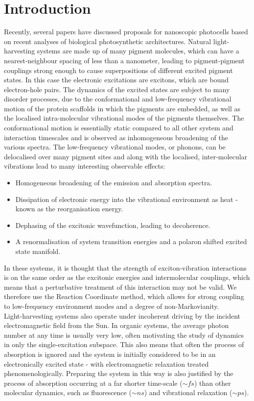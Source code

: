 \documentclass[]{article}
\begin{document}
\section{Introduction}

Recently, several papers have discussed proposals for nanoscopic photocells based on recent analyses of biological photosynthetic architectures\cite{Dorfman}\cite{Creatore2013}\cite{Killoran2015}\cite{Fruchtman2016}. Natural light-harvesting systems are made up of many pigment molecules, which can have a nearest-neighbour spacing of less than a nanometer\cite{Adolphs2006}, leading to pigment-pigment couplings strong enough to cause superpositions of different excited pigment states. In this case the electronic excitations are excitons, which are bound electron-hole pairs. The dynamics of the excited states are subject to many disorder processes, due to the conformational and low-frequency vibrational motion of the protein scaffolds in which the pigments are embedded, as well as the localised intra-molecular vibrational modes of the pigments themselves. The conformational motion is essentially static compared to all other system and interaction timescales and is observed as inhomogeneous broadening of the various spectra. The low-frequency vibrational modes, or phonons, can be delocalised over many pigment sites and along with the localised, inter-molecular vibrations lead to many interesting observable effects:
\begin{itemize}
	\item Homogeneous broadening of the emission and absorption spectra.
	\item Dissipation of electronic energy into the vibrational environment as heat - known as the reorganisation energy.
	\item Dephasing of the excitonic wavefunction, leading to decoherence.
	\item A renormalisation of system transition energies and a polaron shifted excited state manifold.
\end{itemize}
In these systems, it is thought that the strength of exciton-vibration interactions is on the same order as the excitonic energies and intermolecular couplings, which means that a perturbative treatment of this interaction may not be valid. We therefore use the Reaction Coordinate method, which allows for strong coupling to low-frequency environment modes and a degree of non-Markovianity. 
\\
Light-harvesting systems also operate under incoherent driving by the incident electromagnetic field from the Sun. In organic systems, the average photon number at any time is usually very low, often motivating the study of dynamics in only the single-excitation subspace. This also means that often the process of absorption is ignored and the system is initially considered to be in an electronically excited state - with electromagnetic relaxation treated phenomenologically. Preparing the system in this way is also justified by the process of absorption occurring at a far shorter time-scale ($\sim fs$) than other molecular dynamics, such as fluorescence ($\sim ns$) and vibrational relaxation ($\sim ps$). 
\end{document}
